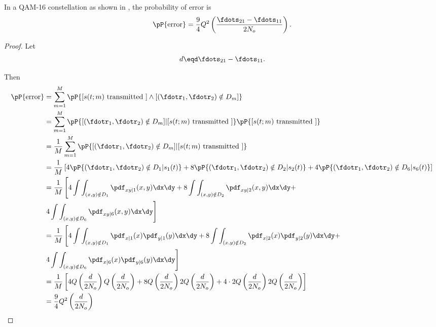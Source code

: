 \begin{theorem}
In a QAM-16 constellation as shown in ,
the probability of error is
\[ \pP{\mbox{error}} = \frac{9}{4} Q^2\left(\frac{\fdots_{21}-\fdots_{11}}{2N_o}\right).\]
\end{theorem}

\begin{proof}
Let
\[ d \eqd \fdots_{21}-\fdots_{11}.\]

Then
\begin{align*}
   \pP{\mbox{error}}
     &= \sum_{m=1}^M \pP{[s(t;m)\mbox{ transmitted }]\land
                            [(\fdotr_1,\fdotr_2)\notin D_m] }
   \\&= \sum_{m=1}^M \pP{[(\fdotr_1,\fdotr_2)\notin D_m]|
                            [s(t;m)\mbox{ transmitted }] }
                      \pP{[s(t;m)\mbox{ transmitted }]}
   \\&= \frac{1}{M}
         \sum_{m=1}^M \pP{[(\fdotr_1,\fdotr_2)\notin D_m]|
                            [s(t;m)\mbox{ transmitted }] }
   \\&= \frac{1}{M}\left[
         4 \pP{(\fdotr_1,\fdotr_2)\notin D_1 | s_1(t)} +
         8 \pP{(\fdotr_1,\fdotr_2)\notin D_2 | s_2(t)} +
         4 \pP{(\fdotr_1,\fdotr_2)\notin D_6 | s_6(t)}
         \right]
   \\&= \frac{1}{M}\left[
         4 \int\int_{(x,y)\notin D_1} \pdf_{xy|1}(x,y)\dx\dy +
         8 \int\int_{(x,y)\notin D_2} \pdf_{xy|2}(x,y)\dx\dy + \right.
         \\& \left.4 \int\int_{(x,y)\notin D_6} \pdf_{xy|6}(x,y)\dx\dy
         \right]
   \\&= \frac{1}{M}\left[
         4 \int\int_{(x,y)\notin D_1} \pdf_{x|1}(x) \pdf_{y|1}(y)\dx\dy +
         8 \int\int_{(x,y)\notin D_2} \pdf_{x|2}(x) \pdf_{y|2}(y)\dx\dy + \right.
         \\& \left.4 \int\int_{(x,y)\notin D_6} \pdf_{x|6}(x) \pdf_{y|6}(y)\dx\dy
         \right]
   \\&= \frac{1}{M} \left[
         4 Q\left(\frac{d}{2N_o}\right) Q\left(\frac{d}{2N_o}\right) +
         8 Q\left(\frac{d}{2N_o}\right) 2Q\left(\frac{d}{2N_o}\right) +
         4\cdot2 Q\left(\frac{d}{2N_o}\right) 2Q\left(\frac{d}{2N_o}\right)
         \right]
   \\&= \frac{9}{4} Q^2\left(\frac{d}{2N_o}\right)
\end{align*}
\end{proof}






